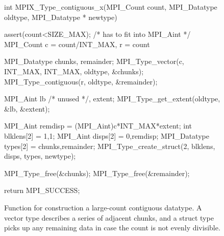 \begin{figure}
\begin{code}
int MPIX_Type_contiguous_x(MPI_Count count, 
                           MPI_Datatype oldtype, 
                           MPI_Datatype * newtype)
{
    assert(count<SIZE_MAX); /* has to fit into MPI_Aint */
    MPI_Count c = count/INT_MAX, r = count%

    MPI_Datatype chunks, remainder;
    MPI_Type_vector(c, INT_MAX, INT_MAX, oldtype, &chunks);
    MPI_Type_contiguous(r, oldtype, &remainder);

    MPI_Aint lb /* unused */, extent;
    MPI_Type_get_extent(oldtype, &lb, &extent);

    MPI_Aint remdisp          = (MPI_Aint)c*INT_MAX*extent;
    int blklens[2]            = {1,1};
    MPI_Aint disps[2]         = {0,remdisp};
    MPI_Datatype types[2]     = {chunks,remainder};
    MPI_Type_create_struct(2, blklens, disps, types, 
    			   newtype);

    MPI_Type_free(&chunks);
    MPI_Type_free(&remainder);

    return MPI_SUCCESS;
}
\end{code}
\caption{Function for construction a large-count contiguous datatype.
A vector type describes a series of adjacent chunks, and a struct type picks up
any remaining data in case the count is not evenly divisible.}
\label{code:type_contig_x}
\end{figure}










